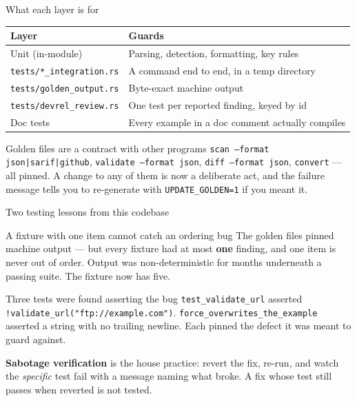 \documentclass[aspectratio=169,10pt]{beamer}
\begin{document}
\begin{frame}{What each layer is for}
  \begin{tabular}{@{}p{}p{}@{}}
    \toprule
    \textbf{Layer} & \textbf{Guards} \\
    \midrule
    Unit (in-module)   & Parsing, detection, formatting, key rules \\
    \texttt{tests/*\_integration.rs} & A command end to end, in a temp directory \\
    \texttt{tests/golden\_output.rs} & Byte-exact machine output \\
    \texttt{tests/devrel\_review.rs} & One test per reported finding, keyed by id \\
    Doc tests          & Every example in a doc comment actually compiles \\
    \bottomrule
  \end{tabular}

  \vspace{0.7em}
  \begin{block}{Golden files are a contract with other programs}
    \texttt{scan --format json|sarif|github}, \texttt{validate --format json},
    \texttt{diff --format json}, \texttt{convert} --- all pinned. A change to any
    of them is now a deliberate act, and the failure message tells you to
    re-generate with \texttt{UPDATE\_GOLDEN=1} if you meant it.
  \end{block}
\end{frame}

\begin{frame}{Two testing lessons from this codebase}
  \begin{alertblock}{A fixture with one item cannot catch an ordering bug}
    The golden files pinned machine output --- but every fixture had at most
    \textbf{one} finding, and one item is never out of order. Output was
    non-deterministic for months underneath a passing suite. The fixture now has
    five.
  \end{alertblock}

  \vspace{0.6em}
  \begin{alertblock}{Three tests were found asserting the bug}
    \texttt{test\_validate\_url} asserted
    \texttt{!validate\_url("ftp://example.com")}.
    \texttt{force\_overwrites\_the\_example} asserted a string with no trailing
    newline. Each pinned the defect it was meant to guard against.
  \end{alertblock}

  \vspace{0.5em}
  {\footnotesize \textbf{Sabotage verification} is the house practice: revert the
  fix, re-run, and watch the \emph{specific} test fail with a message naming what
  broke. A fix whose test still passes when reverted is not tested.}
\end{frame}
\end{document}
